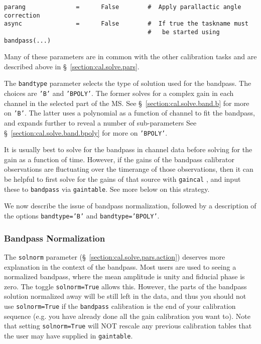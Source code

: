 \begin{verbatim}
parang              =      False        #  Apply parallactic angle correction
async               =      False        #  If true the taskname must
                                        #   be started using bandpass(...)
\end{verbatim}
\normalsize

Many of these parameters are in common with the other calibration
tasks and are described above in \S~\ref{section:cal.solve.pars}.

The {\tt bandtype} parameter selects the type of solution used for the
bandpass.  The choices are {\tt 'B'} and {\tt 'BPOLY'}.  The former 
solves for a complex gain in each channel in the selected part of the
MS. See \S~\ref{section:cal.solve.band.b} for more on {\tt 'B'}.
The latter uses a polynomial as a function of channel to fit the
bandpass, and expands further to reveal a number of sub-parameters
See \S~\ref{section:cal.solve.band.bpoly} for more on {\tt 'BPOLY'}.

It is usually best to solve for the bandpass in channel data before
solving for the gain as a function of time.  However, if the gains of
the bandpass calibrator observations are fluctuating over the
timerange of those observations, then it can be helpful to first solve
for the gains of that source with {\tt gaincal} , and input these to
{\tt bandpass} via {\tt gaintable}.  See more below on this strategy.

We now describe the issue of bandpass normalization, followed by
a description of the options {\tt bandtype='B'} and {\tt bandtype='BPOLY'}.

\subsubsection{Bandpass Normalization}
\label{section:cal.solve.band.solnorm}

The {\tt solnorm} parameter (\S~\ref{section:cal.solve.pars.action})
deserves more explanation in the context of the bandpass.  Most users
are used to seeing a normalized bandpass, where the mean amplitude
is unity and fiducial phase is zero. 
The toggle {\tt solnorm=True} allows this.  However, the parts of the
bandpass solution normalized away will be still left in the data,
and thus you should not use {\tt solnorm=True} if the {\tt bandpass}
calibration is the end of your calibration sequence (e.g. you have
already done all the gain calibration you want to).  Note that
setting {\tt solnorm=True} will NOT rescale any previous calibration
tables that the user may have supplied in {\tt gaintable}.

